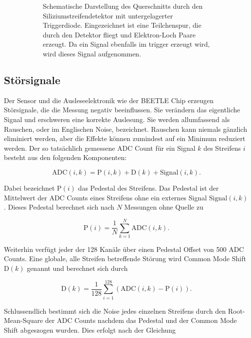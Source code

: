 \begin{figure}[H]
\begin{subfigure}{0.45\textwidth}
    \caption{Schematische Darstellung des Querschnitts durch den Siliziumstreifendetektor mit untergelagerter Triggerdiode. Eingezeichnet ist eine Teilchenspur, die durch den Detektor fliegt und Elektron-Loch Paare erzeugt. Da ein Signal ebenfalls im trigger erzeugt wird, wird dieses Signal aufgenommen.}
    \label{fig:trigger}
  \end{subfigure}%
  \caption{}
\end{figure}

\newpage

\subsection{Störsignale}

Der Sensor und die Ausleseelektronik wie der BEETLE Chip erzeugen Störsignale, die die Messung negativ beeinflussen.
Sie verändern das eigentliche Signal und erschweren eine korrekte Auslesung.
Sie werden allumfassend als Rauschen, oder im Englischen Noise, bezeichnet.
Rauschen kann niemals gänzlich eliminiert werden, aber die Effekte können zumindest auf ein Minimum reduziert werden.
Der so tatsächlich gemessene ADC Count für ein Signal $k$ des Streifens $i$ besteht aus den folgenden Komponenten:

\begin{equation}
  \label{eqn:ADC}
  \mathup{ADC}(i,k) = \mathup{P}(i,k) + \mathup{D}(k) + \mathup{Signal}(i,k).
\end{equation}

Dabei bezeichnet $\mathup{P}(i)$ das Pedestal des Streifens.
Das Pedestal ist der Mittelwert der ADC Counts eines Streifens ohne ein externes Signal $\mathup{Signal}(i,k)$.
Dieses Pedestal berechnet sich nach $N$ Messungen ohne Quelle zu

\begin{equation}
  \label{eqn:pedestal}
  \mathup{P}(i) = \frac{1}{N} \sum^N_{k=1} \mathup{ADC}(i,k).
\end{equation}

Weiterhin verfügt jeder der 128 Kanäle über einen Pedestal Offset von 500 ADC Counts.
Eine globale, alle Streifen betreffende Störung wird Common Mode Shift $\mathup{D}(k)$ genannt und berechnet sich durch

\begin{equation}
  \label{eqn:shift}
  \mathup{D}(k) = \frac{1}{128} \sum^{128}_{i=1} (\mathup{ADC}(i,k) - \mathup{P}(i)).
\end{equation}

Schlussendlich bestimmt sich die Noise jedes einzelnen Streifens durch den Root-Mean-Square der ADC Counts nachdem das Pedestal und der Common Mode Shift abgeszogen wurden.
Dies erfolgt nach der Gleichung

